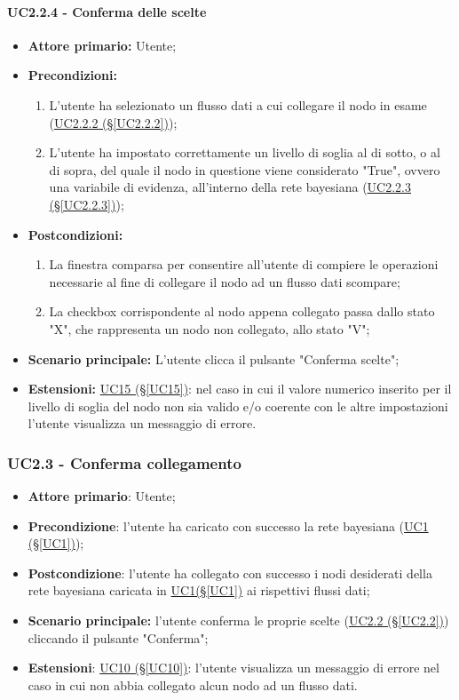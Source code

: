 \paragraph{UC2.2.4 - Conferma delle scelte}\label{UC2.2.4}
\begin{itemize}
\item \textbf{Attore primario:} Utente;
\item \textbf{Precondizioni:}
	\begin{enumerate}
	\item L'utente ha selezionato un flusso dati a cui collegare il nodo in esame (\hyperref[UC2.2.2]{UC2.2.2 							(§\ref*{UC2.2.2})});
	\item L'utente ha impostato correttamente un livello di soglia al di sotto, o al di sopra, 	del quale il nodo in 			questione viene considerato "True", ovvero una variabile di evidenza, all'interno della rete 	bayesiana 							(\hyperref[UC2.2.3]{UC2.2.3 (§\ref*{UC2.2.3})});
	\end{enumerate}
\item \textbf{Postcondizioni:}
	\begin{enumerate}
	\item La finestra comparsa per consentire all'utente di compiere le operazioni necessarie al fine di collegare il 		nodo ad un flusso dati scompare;
	\item La checkbox corrispondente al nodo appena collegato passa dallo stato "X", che rappresenta un nodo non 					collegato, allo stato "V";
	\end{enumerate}
\item \textbf{Scenario principale:} L'utente clicca il pulsante "Conferma scelte";
\item \textbf{Estensioni:} \hyperref[UC15]{UC15 (§\ref*{UC15})}: nel caso in cui il valore numerico inserito per il livello di soglia del nodo non sia valido e/o coerente con le altre impostazioni l'utente visualizza un messaggio di errore.
\end{itemize}

\pagebreak

\subsubsection{UC2.3 - Conferma collegamento}\label{UC2.3}
\begin{itemize}
\item \textbf{Attore primario}: Utente;
\item \textbf{Precondizione}: l'utente ha caricato con successo la rete bayesiana (\hyperref[UC1]{UC1 (§\ref*{UC1})});
\item \textbf{Postcondizione}: l'utente ha collegato con successo i nodi desiderati della rete bayesiana caricata 			in \hyperref[UC1]{UC1(§\ref*{UC1})} ai rispettivi flussi dati;
\item \textbf{Scenario principale:} l'utente conferma le proprie scelte (\hyperref[UC2.2]{UC2.2 (§\ref*{UC2.2})}) cliccando il pulsante "Conferma";
\item \textbf{Estensioni}: \hyperref[UC10]{UC10 (§\ref*{UC10})}: l'utente visualizza un messaggio di errore nel caso in cui non abbia collegato alcun nodo ad un flusso dati.
\end{itemize}
\newpage

